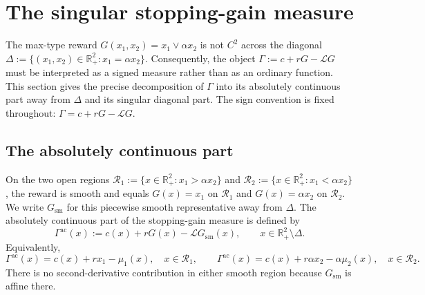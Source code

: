 \documentclass[pdflatex,sn-mathphys-num]{sn-jnl}
\theoremstyle{plain}
\theoremstyle{definition}
\newcommand{\R}{\mathbb{R}}
\begin{document}
\section{The singular stopping-gain measure}
\label{sec:singular-stopping-gain}
The max-type reward $G(x_1,x_2)=x_1\vee \alpha x_2$ is not $C^2$ across the
diagonal $\Delta:=\{(x_1,x_2)\in\R^2_+:x_1=\alpha x_2\}$. Consequently, the
object $\Gamma:=c+rG-\mathcal LG$ must be interpreted as a signed measure
rather than as an ordinary function. This section gives the precise
decomposition of $\Gamma$ into its absolutely continuous part away from
$\Delta$ and its singular diagonal part. The sign convention is fixed
throughout:
$\Gamma=c+rG-\mathcal LG$.

\subsection{The absolutely continuous part}
\label{sec:Gamma-ac}
On the two open regions
$   \mathcal R_1:=\{x\in\R^2_+:x_1>\alpha x_2\}$
and
$   \mathcal R_2:=\{x\in\R^2_+:x_1<\alpha x_2\}$,
the reward is smooth and equals $G(x)=x_1$ on $\mathcal R_1$ and
$G(x)=\alpha x_2$ on $\mathcal R_2$. We write $G_{\mathrm{sm}}$ for this
piecewise smooth representative away from $\Delta$. The absolutely continuous
part of the stopping-gain measure is defined by
\begin{equation}
\label{eq:Gamma-ac-def}
   \Gamma^{\mathrm{ac}}(x)
   :=
   c(x)+rG(x)-\mathcal L G_{\mathrm{sm}}(x),
   \qquad x\in\R^2_+\setminus\Delta.
\end{equation}
Equivalently,
\[
   \Gamma^{\mathrm{ac}}(x)=c(x)+r x_1-\mu_1(x),
   \quad x\in\mathcal R_1,
   \qquad
   \Gamma^{\mathrm{ac}}(x)=c(x)+r\alpha x_2-\alpha\mu_2(x),
   \quad x\in\mathcal R_2.
\]
There is no second-derivative contribution in either smooth region because
$G_{\mathrm{sm}}$ is affine there.
\end{document}

